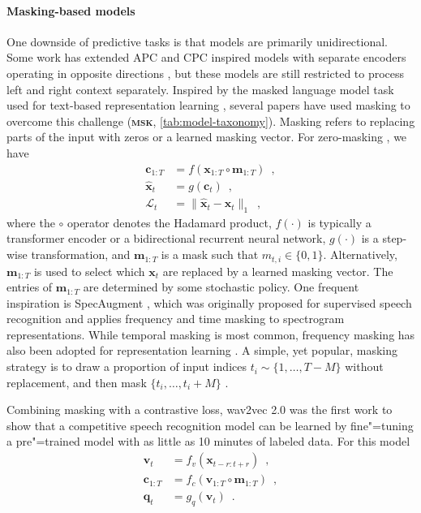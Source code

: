 {\paragraph{Masking-based models} One downside of predictive tasks is that models are primarily unidirectional. Some work has extended APC and CPC inspired models with separate encoders operating in opposite directions \parencite{ling_deep_2020, kawakami_learning_2020, borgholt_scaling_2021}, but these models are still restricted to process left and right context separately. Inspired by the masked language model task used for text-based representation learning \parencite{devlin_bert_2018}, several papers have used masking to overcome this challenge (\textbf{\textsc{msk}}, \cref{tab:model-taxonomy}). Masking refers to replacing parts of the input with zeros or a learned masking vector. For zero-masking \parencite{jiang_improving_2019, liu_mockingjay_2020, wang_unsupervised_2020, chi_audio_2020, ling_decoar_2020}, we have
\begin{align}
    \mathbf{c}_{1:T} &= f(\mathbf{x}_{1:T} \circ \mathbf{m}_{1:T}) \enspace , \\
    \hat{\mathbf{x}}_{t} &= g(\mathbf{c}_{t}) \enspace , \\
    \mathcal{L}_t &= \lVert \hat{\mathbf{x}}_{t} - \mathbf{x}_{t} \rVert_1\enspace,
\end{align}
where the $\circ$ operator denotes the Hadamard product, $f(\cdot)$ is typically a transformer encoder or a bidirectional recurrent neural network, $g(\cdot)$ is a step-wise transformation, and $\mathbf{m}_{1:T}$ is a mask such that $m_{t,i} \in \{0,1\}$. Alternatively, $\mathbf{m}_{1:T}$ is used to select which $\mathbf{x}_t$ are replaced by a learned masking vector. The entries of $\mathbf{m}_{1:T}$ are determined by some stochastic policy. One frequent inspiration is SpecAugment \parencite{park_specaugment_2019}, which was originally proposed for supervised speech recognition and applies frequency and time masking to spectrogram representations.
While temporal masking is most common, frequency masking has also been adopted for representation learning  \parencite{wang_unsupervised_2020}. A simple, yet popular, masking strategy is to draw a proportion of input indices $t_i\sim\{1,\dots,T-M\}$ without replacement, and then mask $\{t_i, \dots, t_i+M\}$ \parencite{baevski_wav2vec_2020, hsu_hubert_2021, ling_decoar_2020}.

Combining masking with a contrastive loss, wav2vec 2.0 was the first work to show that a competitive speech recognition model can be learned by fine"=tuning a pre"=trained model with as little as 10 minutes of labeled data. For this model
%
\begin{align}
    \mathbf{v}_{t} &= f_v(\mathbf{x}_{t-r:t+r})  \enspace , \\
    \mathbf{c}_{1:T} &= f_c(\mathbf{v}_{1:T} \circ \mathbf{m}_{1:T})  \enspace , \\
    \mathbf{q}_t &= g_q(\mathbf{v}_t) \enspace . \label{eq_brief: w2v2 qtz}
\end{align}

}

